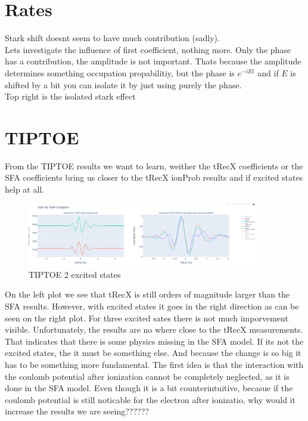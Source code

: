 \section{Rates}
Stark shift doesnt seem to have much contribution (sadly).\\
Lets investigate the influence of first coefficient, nothing more. Only the phase has a contribution, the amplitude is not important.
Thats because the amplitude determines something occupation propabilitiy, but the phase is $e^{-iEt}$ and if $E$ is shifted by a bit you can isolate it by just using purely the phase.\\
Top right is the isolated stark effect







\section{TIPTOE}
From the TIPTOE results we want to learn, weither the tRecX coefficients or the SFA coefficients bring us closer to the tRecX ionProb results and if excited states help at all.

\begin{figure}
    \centering
    \includegraphics[width=0.9\textwidth]{figures/image.png}
    \caption{TIPTOE 2 excited states}
    \label{fig:tiptoe}
\end{figure}

On the left plot we see that tRecX is still orders of magnitude larger than the SFA results. 
However, with excited states it goes in the right direction as can be seen on the right plot. 
For three excited sates there is not much imporvement visible.
Unfortunately, the results are no where close to the tRecX measurements. That indicates that there is some physics missing in the SFA model.
If its not the excited states, the it must be something else.
And because the change is so big it has to be something more fundamental.
The first idea is that the interaction with the coulomb potential after ionization cannot be completely neglected, as it is done in the SFA model.
Even though it is a bit counterintuitive, becasue if the coulomb potential is still noticable for the electron after ionizatio, why would it increase the results we are seeing??????



